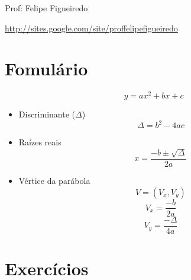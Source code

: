 \documentclass[a4paper]{article}
\begin{document}
\parbox[c]{.825\textwidth}{\raggedright%
{Prof: Felipe Figueiredo\par}
{\url{http://sites.google.com/site/proffelipefigueiredo}}

\vspace{1cm}
}



\section{Fomulário}

\begin{displaymath}
  y = a x^2 + b x + c
\end{displaymath}

\begin{itemize}
\item Discriminante ($\Delta$)
  \begin{displaymath}
    \Delta = b^2 - 4ac
  \end{displaymath}

\item Raízes reais
  \begin{displaymath}
    x = \frac{-b \pm \sqrt{\Delta}}{2a}
  \end{displaymath}

\item Vértice da parábola
  \begin{displaymath}
    V = (V_x, V_y)
  \end{displaymath}
  \begin{displaymath}
  V_x = \frac{-b}{2a}    
  \end{displaymath}
  \begin{displaymath}
    V_y = \frac{-\Delta}{4a}
  \end{displaymath}

\end{itemize}

\section{Exercícios}
\end{document}
